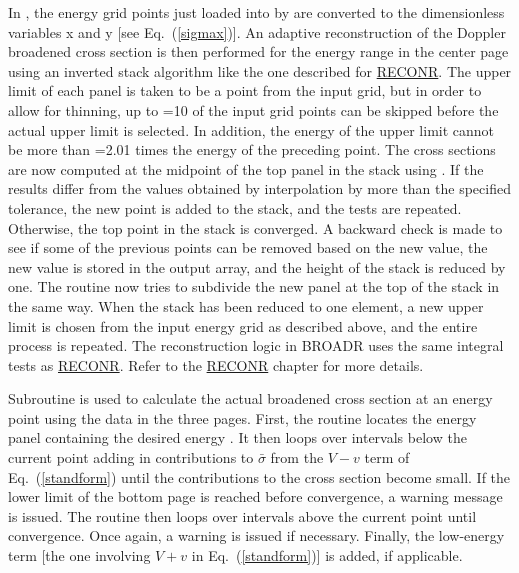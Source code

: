 In , the energy grid points
just loaded into  by 
are converted to the dimensionless variables x and y
[see Eq.~(\ref{sigmax})].  An adaptive reconstruction
 of the Doppler broadened
cross section is then performed for the energy range in the
center page using an inverted stack
algorithm like the one described for
\hyperlink{sRECONRhy}{RECONR}.  The
upper limit of each panel is taken to be a point from the input
grid, but in order to allow for thinning, up to =10
of the input grid points can be skipped before the actual upper
limit is selected.  In addition, the energy of the upper limit
cannot be more than =2.01 times the energy of the
preceding point.  The cross sections are now computed at the
midpoint of the top panel in the stack using .  If
the results differ from the values obtained by interpolation by
more than the specified tolerance, the new point is added to the
stack, and the tests are repeated.  Otherwise, the top point in
the stack is converged.  A backward check is made to see if some
of the previous points can be removed based on the new value, the
new value is stored in the output array, and the height of the
stack is reduced by one.   The routine now tries to subdivide the
new panel at the top of the stack in the same way.  When the
stack has been reduced to one element, a new upper limit is
chosen from the input energy grid as described above, and the
entire process is repeated.  The reconstruction logic in BROADR
uses the same integral tests as
\hyperlink{sRECONRhy}{RECONR}.  Refer to
the \hyperlink{sRECONRhy}{RECONR} chapter for more details.

Subroutine  is used
to calculate the actual broadened cross section at an energy
point using the data in the three pages.  First, the routine
locates the energy panel containing the desired energy .
It then loops over intervals below the current point adding in
contributions to $\bar{\sigma}$ from the $V{-}v$ term of
Eq.~(\ref{standform}) until the contributions to the cross section
become small.  If the lower limit of the bottom page is reached
before convergence, a warning message is issued.  The routine
then loops over intervals above the current point until
convergence.  Once again, a warning is issued if necessary.
Finally, the low-energy term [the one involving
$V{+}v$ in Eq.~(\ref{standform})] is added, if applicable.

